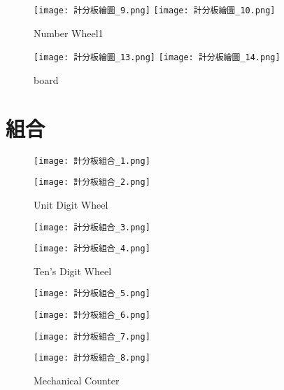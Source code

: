 {\begin{figure}[hbt!]
  \centering
  \texttt{[image: 計分板繪圖\_9.png]}
  \centering
  \texttt{[image: 計分板繪圖\_10.png]}
  \caption{Number Wheel1}
  \label{fig:photo8}
\end{figure}

\begin{figure}[hbt!]
  \centering
  \texttt{[image: 計分板繪圖\_13.png]}
  \centering
  \texttt{[image: 計分板繪圖\_14.png]}
  \caption{board}
  \label{fig:photo9}
\end{figure}
}

\newpage

\section{組合}
{
\begin{figure}[hbt!]
  \centering
  \texttt{[image: 計分板組合\_1.png]}
\end{figure}
\begin{figure}[hbt!]
  \centering
  \texttt{[image: 計分板組合\_2.png]}
  \caption{Unit Digit Wheel}
  \label{fig:photo10}
\end{figure}

\begin{figure}[hbt!]
  \centering
  \texttt{[image: 計分板組合\_3.png]}
\end{figure}
\begin{figure}[hbt!]
  \centering
  \texttt{[image: 計分板組合\_4.png]}
  \caption{Ten's Digit Wheel}
  \label{fig:photo11}
\end{figure}

\begin{figure}[hbt!]
  \centering
  \texttt{[image: 計分板組合\_5.png]}
\end{figure}
\begin{figure}[hbt!]
  \centering
  \texttt{[image: 計分板組合\_6.png]}
\end{figure}
\begin{figure}[hbt!]
  \centering
  \texttt{[image: 計分板組合\_7.png]}
\end{figure}
\begin{figure}[hbt!]
  \centering
  \texttt{[image: 計分板組合\_8.png]}
  \caption{Mechanical Counter}
  \label{fig:photo12}
\end{figure}
}

